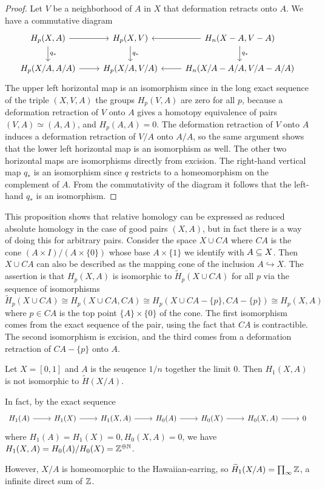 \begin{proof}
Let $V$ be a neighborhood of $A$ in $X$ that deformation retracts onto $A$. We have a commutative diagram
\[\begin{tikzcd}
H_p(X,A)\ar[r]\ar[d,"q_*"]&H_p(X,V)\ar[d,"q_*"]&H_n(X-A,V-A)\ar[l]\ar[d,"q_*"]\\
H_p(X/A,A/A)\ar[r]&H_p(X/A,V/A)&H_n(X/A-A/A,V/A-A/A)\ar[l]
\end{tikzcd}\]
The upper left horizontal map is an isomorphism since in the long exact sequence of the triple $(X,V,A)$ the groups $H_p(V,A)$ are zero for all $p$, because a deformation retraction of $V$ onto $A$ gives a homotopy equivalence of pairs $(V,A)\simeq(A,A)$, and $H_p(A,A)=0$. The deformation retraction of $V$ onto $A$ induces a deformation retraction
of $V/A$ onto $A/A$, so the same argument shows that the lower left horizontal map is an isomorphism as well. The other two horizontal maps are isomorphisms directly from excision. The right-hand vertical map $q_*$ is an isomorphism since $q$ restricts to a homeomorphism on the complement of $A$. From the commutativity of the diagram it follows that the left-hand $q_*$ is an isomorphism.
\end{proof}
This proposition shows that relative homology can be expressed as reduced absolute homology in the case of good pairs $(X,A)$, but in fact there is a way of doing this for arbitrary pairs. Consider the space $X\cup CA$ where $CA$ is the cone $(A\times I)/(A\times\{0\})$ whose base $A\times\{1\}$ we identify with $A\subseteq X$. Then $X\cup CA$ can also be described as the mapping cone of the inclusion $A\hookrightarrow X$. The assertion is that $H_p(X,A)$ is isomorphic to $\widetilde{H}_p(X\cup CA)$ for all $p$ via the sequence of isomorphisms
\[\widetilde{H}_p(X\cup CA)\cong H_p(X\cup CA,CA)\cong H_p(X\cup CA-\{p\},CA-\{p\})\cong H_p(X,A)\]
where $p\in CA$ is the top point $\{A\}\times\{0\}$ of the cone. The first isomorphism comes from the exact sequence of the pair, using the fact that $CA$ is contractible. The second isomorphism is excision, and the third comes from a deformation retraction of $CA-\{p\}$ onto $A$.
\begin{remark}
Let $X=[0,1]$ and $A$ is the seuqence $1/n$ together the limit $0$. Then $H_1(X,A)$ is not isomorphic to $\widetilde{H}(X/A)$.\par
In fact, by the exact sequence 
\[\begin{tikzcd}
H_1(A)\ar[r]&H_1(X)\ar[r]&H_1(X,A)\ar[r]&H_0(A)\ar[r]&H_0(X)\ar[r]&H_0(X,A)\ar[r]&0
\end{tikzcd}\]
where $H_1(A)=H_1(X)=0,H_0(X,A)=0$, we have $H_1(X,A)=H_0(A)/H_0(X)=\mathbb{Z}^{\oplus\mathbb{N}}$.\par
However, $X/A$ is homeomorphic to the Hawaiian-earring, so $\widetilde{H}_1(X/A)=\prod_{\infty}\mathbb{Z}$, a infinite direct sum of $\mathbb{Z}$.
\end{remark}
